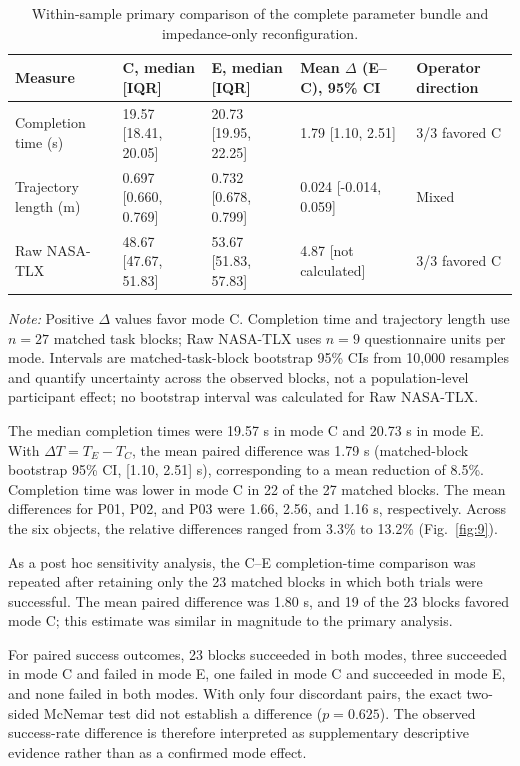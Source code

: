 \begin{table}[!t]
\centering
\caption{Within-sample primary comparison of the complete parameter bundle and impedance-only reconfiguration.}
\label{tab:9}
\small
\setlength{\tabcolsep}{5pt}
\renewcommand{\arraystretch}{1.16}
\begin{tabularx}{\textwidth}{@{}p{}YYYp{0.20\textwidth}@{}}
\toprule
Measure & C, median [IQR] & E, median [IQR] & Mean $\Delta$ (E--C), 95\% CI & Operator direction \\
\midrule
Completion time (s) & 19.57 [18.41, 20.05] & 20.73 [19.95, 22.25] & 1.79 [1.10, 2.51] & 3/3 favored C \\
Trajectory length (m) & 0.697 [0.660, 0.769] & 0.732 [0.678, 0.799] & 0.024 [-0.014, 0.059] & Mixed \\
Raw NASA-TLX & 48.67 [47.67, 51.83] & 53.67 [51.83, 57.83] & 4.87 [not calculated] & 3/3 favored C \\
\bottomrule
\end{tabularx}
\par\smallskip
\footnotesize\textit{Note:} Positive $\Delta$ values favor mode C. Completion time and trajectory length use $n=27$ matched task blocks; Raw NASA-TLX uses $n=9$ questionnaire units per mode. Intervals are matched-task-block bootstrap 95\% CIs from 10,000 resamples and quantify uncertainty across the observed blocks, not a population-level participant effect; no bootstrap interval was calculated for Raw NASA-TLX.
\end{table}
The median completion times were 19.57 s in mode C and 20.73 s in mode E. With $\Delta T=T_E-T_C$, the mean paired difference was 1.79 s (matched-block bootstrap 95\% CI, [1.10, 2.51] s), corresponding to a mean reduction of 8.5\%. Completion time was lower in mode C in 22 of the 27 matched blocks. The mean differences for P01, P02, and P03 were 1.66, 2.56, and 1.16 s, respectively. Across the six objects, the relative differences ranged from 3.3\% to 13.2\% (Fig.~\ref{fig:9}).

As a post hoc sensitivity analysis, the C--E completion-time comparison was repeated after retaining only the 23 matched blocks in which both trials were successful. The mean paired difference was 1.80 s, and 19 of the 23 blocks favored mode C; this estimate was similar in magnitude to the primary analysis.

For paired success outcomes, 23 blocks succeeded in both modes, three succeeded in mode C and failed in mode E, one failed in mode C and succeeded in mode E, and none failed in both modes. With only four discordant pairs, the exact two-sided McNemar test did not establish a difference ($p=0.625$). The observed success-rate difference is therefore interpreted as supplementary descriptive evidence rather than as a confirmed mode effect.

